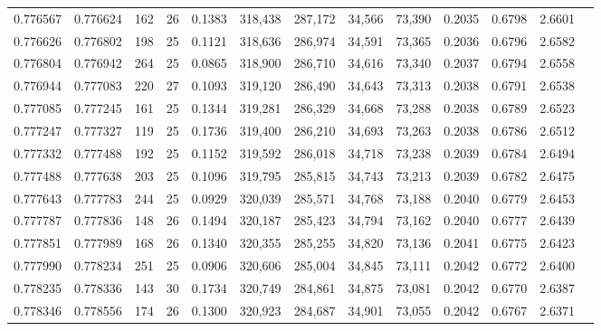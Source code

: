 \begin{tabular}{rrrrrrrrrrrrr}
0.776567 & 0.776624 &   162 &  26 &                                     0.1383 & 318,438 & 287,172 &  34,566 &  73,390 & 0.2035 & 0.6798 & 2.6601 \\
0.776626 & 0.776802 &   198 &  25 &                                     0.1121 & 318,636 & 286,974 &  34,591 &  73,365 & 0.2036 & 0.6796 & 2.6582 \\
0.776804 & 0.776942 &   264 &  25 &                                     0.0865 & 318,900 & 286,710 &  34,616 &  73,340 & 0.2037 & 0.6794 & 2.6558 \\
0.776944 & 0.777083 &   220 &  27 &                                     0.1093 & 319,120 & 286,490 &  34,643 &  73,313 & 0.2038 & 0.6791 & 2.6538 \\
0.777085 & 0.777245 &   161 &  25 &                                     0.1344 & 319,281 & 286,329 &  34,668 &  73,288 & 0.2038 & 0.6789 & 2.6523 \\
0.777247 & 0.777327 &   119 &  25 &                                     0.1736 & 319,400 & 286,210 &  34,693 &  73,263 & 0.2038 & 0.6786 & 2.6512 \\
0.777332 & 0.777488 &   192 &  25 &                                     0.1152 & 319,592 & 286,018 &  34,718 &  73,238 & 0.2039 & 0.6784 & 2.6494 \\
0.777488 & 0.777638 &   203 &  25 &                                     0.1096 & 319,795 & 285,815 &  34,743 &  73,213 & 0.2039 & 0.6782 & 2.6475 \\
0.777643 & 0.777783 &   244 &  25 &                                     0.0929 & 320,039 & 285,571 &  34,768 &  73,188 & 0.2040 & 0.6779 & 2.6453 \\
0.777787 & 0.777836 &   148 &  26 &                                     0.1494 & 320,187 & 285,423 &  34,794 &  73,162 & 0.2040 & 0.6777 & 2.6439 \\
0.777851 & 0.777989 &   168 &  26 &                                     0.1340 & 320,355 & 285,255 &  34,820 &  73,136 & 0.2041 & 0.6775 & 2.6423 \\
0.777990 & 0.778234 &   251 &  25 &                                     0.0906 & 320,606 & 285,004 &  34,845 &  73,111 & 0.2042 & 0.6772 & 2.6400 \\
0.778235 & 0.778336 &   143 &  30 &                                     0.1734 & 320,749 & 284,861 &  34,875 &  73,081 & 0.2042 & 0.6770 & 2.6387 \\
0.778346 & 0.778556 &   174 &  26 &                                     0.1300 & 320,923 & 284,687 &  34,901 &  73,055 & 0.2042 & 0.6767 & 2.6371 \\

\end{tabular}

